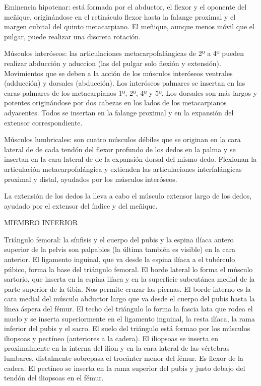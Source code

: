 \documentclass[a4paper,12pt]{article} %
\begin{document}
Eminencia hipotenar: está formada por el abductor, el flexor y el oponente del meñique, originándose en el retináculo flexor hasta la falange proximal y el margen cubital del quinto metacarpiano. El meñique, aunque menos móvil que el pulgar, puede realizar una discreta rotación.

Músculos interóseos: las articulaciones metacarpofalángicas de 2º a 4º pueden realizar abducción y aduccion (las del pulgar solo flexión y extensión). Movimientos que se deben a la acción de los músculos interóseos ventrales (adducción) y dorsales (abducción). Los interóseos palmares se insertan en las caras palmares de los metacarpianos 1º, 2º, 4º y 5º. Los dorsales son más largos y potentes originándose por dos cabezas en los lados de los metacarpianos adyacentes. Todos se insertan en la falange proximal y en la expansión del extensor correspondiente.

Músculos lumbricales: son cuatro músculos débiles que se originan en la cara lateral de de cada tendón del flexor profundo de los dedos en la palma y se insertan en la cara lateral de de la expansión dorsal del mismo dedo. Flexionan la articulación metacarpofalángica y extienden las articulaciones interfalángicas proximal y distal, ayudados por los músculos interóseos.

La extensión de los dedos la lleva a cabo el músculo extensor largo de los dedos, ayudado por el extensor del índice y del meñique.

MIEMBRO INFERIOR

Triángulo femoral: la sínfisis y el cuerpo del pubis y la espina ilíaca antero superior de la pelvis son palpables (la última también es visible) en la cara anterior. El ligamento inguinal, que va desde la espina ilíaca a el tubérculo púbico, forma la base del triángulo femoral. El borde lateral lo forma el músculo sartorio, que inserta en la espina ilíaca y en la superficie subcutánea medial de la parte superior de la tibia. Nos permite cruzar las piernas. El borde interno es la cara medial del músculo abductor largo que va desde el cuerpo del pubis hasta la línea áspera del fémur. El techo del triángulo lo forma la fascia lata que rodea el muslo y se inserta superiormente  en el ligamento inguinal, la resta ilíaca, la rama inferior del pubis y el sacro. El suelo del triángulo está formao por los músculos iliopsoas y pectíneo (anteriores a la cadera). El iliopsoas se inserta en proximalmente en la interna del ilion y en la cara lateral de las vértebras lumbares, distalmente sobrepasa el trocánter menor del fémur. Es flexor de la cadera. El pectíneo se inserta en la rama superior del pubis y justo debajo del tendón del iliopsoas en el fémur.
\end{document}
